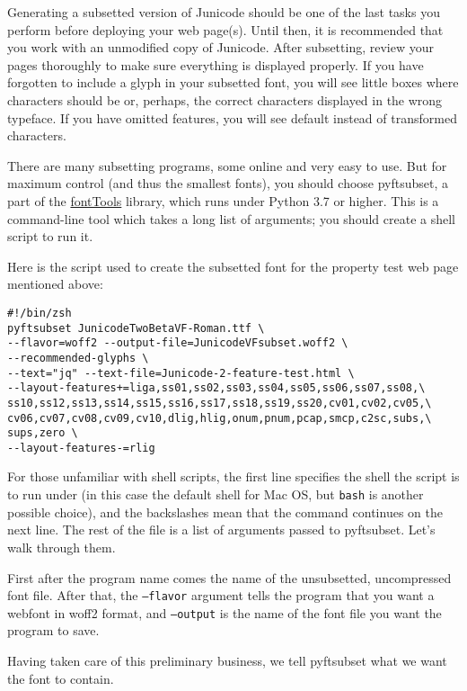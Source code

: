 \documentclass[12pt,letterpaper,openany]{book}
\begin{document}
Generating a subsetted version of Junicode should be one of the last tasks you
perform before deploying your web page(s). Until then, it is recommended that
you work with an unmodified copy of Junicode. After subsetting, review your
pages thoroughly to make sure everything is displayed properly. If you have
forgotten to include a glyph in your subsetted font, you will see little boxes
where characters should be or, perhaps, the correct characters
displayed in the wrong typeface. If you have omitted features, you will see
default instead of transformed characters.

There are many subsetting programs, some online and very easy to use. But for
maximum control (and thus the smallest fonts), you should choose pyftsubset, a
part of the \href{https://github.com/fonttools/fonttools}{fontTools} library,
which runs under Python 3.7 or higher. This is a command-line tool which
takes a long list of arguments; you should create a shell script to run it.

Here is the script used to create the subsetted font for the property test
web page mentioned above:

\begin{verbatim}
#!/bin/zsh
pyftsubset JunicodeTwoBetaVF-Roman.ttf \
--flavor=woff2 --output-file=JunicodeVFsubset.woff2 \
--recommended-glyphs \
--text="jq" --text-file=Junicode-2-feature-test.html \
--layout-features+=liga,ss01,ss02,ss03,ss04,ss05,ss06,ss07,ss08,\
ss10,ss12,ss13,ss14,ss15,ss16,ss17,ss18,ss19,ss20,cv01,cv02,cv05,\
cv06,cv07,cv08,cv09,cv10,dlig,hlig,onum,pnum,pcap,smcp,c2sc,subs,\
sups,zero \
--layout-features-=rlig
\end{verbatim}

\noindent For those unfamiliar with shell scripts, the first line specifies the shell
the script is to run under (in this case the default shell for Mac OS, but
\texttt{bash} is another possible choice), and the backslashes mean
that the command continues on the next line. The rest of the file is a list
of arguments passed to pyftsubset. Let's walk through them.

First after the program name comes the name of the unsubsetted, uncompressed
font file. After that,
the \texttt{--flavor} argument tells the program that you want a webfont in
woff2 format, and \texttt{--output} is the name of the font file you want the
program to save.

Having taken care of this preliminary business, we tell pyftsubset what we
want the font to contain.
\end{document}
